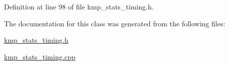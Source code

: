 Definition at line 98 of file kmp\-\_\-stats\-\_\-timing.\-h.



The documentation for this class was generated from the following files\-:\begin{DoxyCompactItemize}
\item 
\hyperlink{kmp__stats__timing_8h}{kmp\-\_\-stats\-\_\-timing.\-h}\item 
\hyperlink{kmp__stats__timing_8cpp}{kmp\-\_\-stats\-\_\-timing.\-cpp}\end{DoxyCompactItemize}
